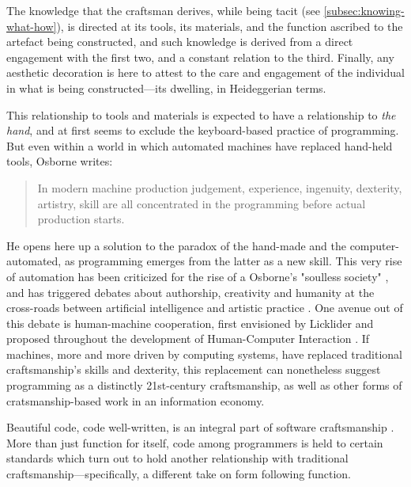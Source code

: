 The knowledge that the craftsman derives, while being tacit (see \autoref{subsec:knowing-what-how}), is directed at its tools, its materials, and the function ascribed to the artefact being constructed, and such knowledge is derived from a direct engagement with the first two, and a constant relation to the third. Finally, any aesthetic decoration is here to attest to the care and engagement of the individual in what is being constructed—its dwelling, in Heideggerian terms.

This relationship to tools and materials is expected to have a relationship to \emph{the hand}, and at first seems to exclude the keyboard-based practice of programming. But even within a world in which automated machines have replaced hand-held tools, Osborne writes:

\begin{quote}
    In modern machine production judgement, experience, ingenuity, dexterity, artistry, skill are all concentrated in the programming before actual production starts. \citep{osborne_aesthetic_1977}
\end{quote}

He opens here up a solution to the paradox of the hand-made and the computer-automated, as programming emerges from the latter as a new skill. This very rise of automation has been criticized for the rise of a Osborne's "soulless society" \citep{osborne_aesthetic_1977}, and has triggered debates about authorship, creativity and humanity at the cross-roads between artificial intelligence and artistic practice \citep{mazzone_art_2019}. One avenue out of this debate is human-machine cooperation, first envisioned by Licklider and proposed throughout the development of Human-Computer Interaction \citep{licklider_mancomputer_1960,grudin_tool_2016}. If machines, more and more driven by computing systems, have replaced traditional craftsmanship's skills and dexterity, this replacement can nonetheless suggest programming as a distinctly 21st-century craftsmanship, as well as other forms of cratsmanship-based work in an information economy.

Beautiful code, code well-written, is an integral part of software craftsmanship \citep{oram_beautiful_2007}. More than just function for itself, code among programmers is held to certain standards which turn out to hold another relationship with traditional craftsmanship—specifically, a different take on form following function.

